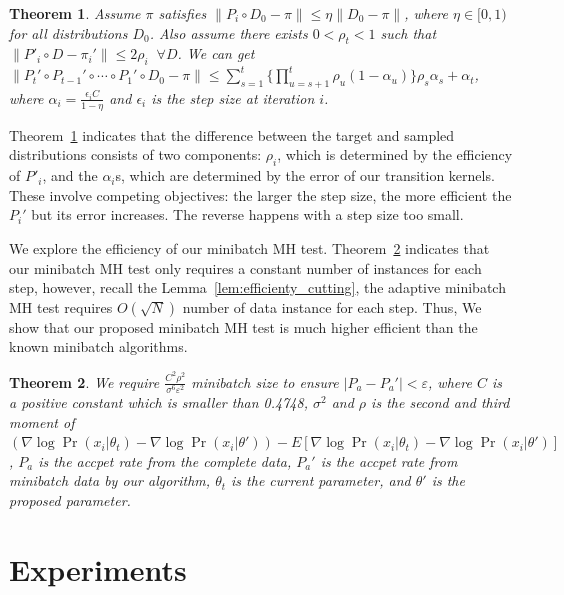 \documentclass{article}
\newtheorem{theorem}{Theorem}
\begin{document}
\begin{theorem}\label{thm:theory3}
Assume $\pi$ satisfies $\|P_i \circ D_0 - \pi\| \leq \eta \|D_0 - \pi\|$, where $\eta \in [0, 1)$ for
all distributions $D_0$. Also assume there exists $0 < \rho_t < 1$ such that $\|P'_i \circ D -
\pi_i'\| \leq 2\rho_i \;\; \forall D$. We can get $\| P_t' \circ P_{t-1}' \circ \cdots \circ P_1' \circ D_0 - \pi
\| \leq \sum_{s=1}^t \{\prod _{u=s+1}^t \rho_u (1-\alpha_u)\} \rho_s \alpha_s + \alpha_t $, where
$\alpha_i = \frac{\epsilon_i C }{1-\eta}$ and $\epsilon_i$ is the step size at iteration $i$.
\end{theorem}


Theorem~\ref{thm:theory3} indicates that the difference between the target and sampled distributions
consists of two components: $\rho_i$, which is determined by the efficiency of $P'_i$, and the
$\alpha_i$s, which are determined by the error of our transition kernels. These involve competing
objectives: the larger the step size, the more efficient the $P_i'$ but its error increases.  The
reverse happens with a step size too small.

We explore the efficiency of our minibatch MH test. Theorem~\ref{thm:efficiency} indicates that our minibatch MH test only requires a constant number of instances for each step, however, recall the Lemma~\ref{lem:efficienty_cutting}, the adaptive minibatch MH test requires $O(\sqrt{N})$ number of data instance for each step. Thus, We show that our proposed minibatch MH test is much higher efficient than the known minibatch algorithms. 

\begin{theorem}\label{thm:efficiency}
We require $\frac{ C^2 \rho^2 }{\sigma^6 \varepsilon^2}$ minibatch size to ensure $|P_a -P_a'| < \varepsilon$, where $C$ is a positive constant which is smaller than 0.4748, $\sigma^2 $ and $\rho$ is the second and third moment of $(\nabla\log \Pr(x_i|\theta_t) - \nabla\log\Pr(x_i|\theta')) - E\left[ \nabla\log \Pr(x_i|\theta_t) - \nabla\log\Pr(x_i|\theta')\right]$, $P_a$ is the accpet rate from the complete data, $P_a'$ is the accpet rate from minibatch data by our algorithm, $\theta_t$ is the current parameter, and $\theta'$ is the proposed parameter. 

\end{theorem}


\section{Experiments}\label{sec:experiments}
\end{document}
